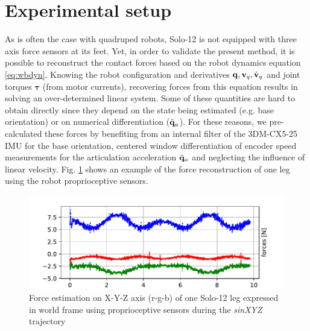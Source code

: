 \section{Experimental setup}
%  
As is often the case with quadruped robots, Solo-12 is not equipped with three axis force sensors at its feet. 
Yet, in order to validate the present method, it is possible to reconstruct the contact forces based on the robot dynamics 
equation \eqref{eq:wbdyn}. Knowing the robot configuration and derivatives ${\bf q},{\bf v}_q,\dot{{\bf v}}_q$ and joint torques $\bm\tau$ (from motor currents), 
recovering forces from this equation results in solving an over-determined linear system. Some of these quantities are hard to obtain directly 
since they depend on the state being estimated (e.g. base orientation) or on numerical differentiation ($\ddot{{\bf q}}_a$). For these reasons, we pre-calculated 
these forces by benefiting from an internal filter of the 3DM-CX5-25 IMU for the base orientation, centered window differentiation of encoder speed 
measurements for the articulation acceleration $\ddot{{\bf q}}_a$ and neglecting the influence of linear velocity. Fig. \ref{fig:force_est} shows an example of 
the force reconstruction of one leg using the robot proprioceptive sensors.
%
\begin{figure}
    \centering
    \includegraphics[width=0.9\columnwidth]{figures/centroidal/forces_solo_1leg.pdf}
    \caption{Force estimation on X-Y-Z axis (r-g-b) of one Solo-12 leg expressed in world frame using proprioceptive sensors during the \textit{sinXYZ} trajectory}
    \label{fig:force_est}
\end{figure}

